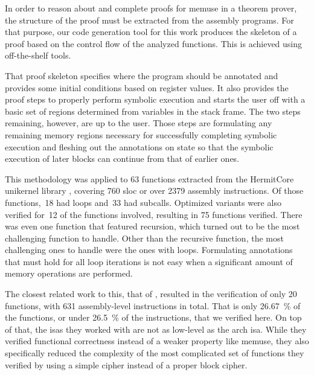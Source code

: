 In order to reason about and complete proofs for \gls{memuse} in a theorem prover, the structure of the proof must be extracted from the assembly programs.
For that purpose, our code generation tool for this work produces the skeleton of a proof based on the control flow of the analyzed functions.
This is achieved using off-the-shelf tools.

That proof skeleton specifies where the program should be annotated and provides some initial conditions based on register values.
It also provides the proof steps to properly perform symbolic execution and starts the user off with a basic set of regions determined from variables in the stack frame.
The two steps remaining, however, are up to the user.
Those steps are formulating any remaining memory regions necessary for successfully completing symbolic execution and fleshing out the annotations on state so that the symbolic execution of later blocks can continue from that of earlier ones.

This methodology was applied to \num{63} functions extracted from the HermitCore \autocite{lankes2016hermitcore} unikernel library \autocite{madhavapeddy2014unikernels}, covering \num{760} \gls{sloc} or over \num{2379} assembly instructions.
Of those functions,~\num{18} had loops and~\num{33} had subcalls.
Optimized variants were also verified for~\num{12} of the functions involved, resulting in \num{75} functions verified.
There was even one function that featured recursion, which turned out to be the most challenging function to handle.
Other than the recursive function, the most challenging ones to handle were the ones with loops.
Formulating annotations that must hold for all loop iterations is not easy when a significant amount of memory operations are performed.

The closest related work to this, that of \textcite{matthews2006verification}, resulted in the verification of only \num{20} functions, with \num{631} assembly-level instructions in total.
That is only \SI{26.67}{\percent} of the functions, or under \SI{26.5}{\percent} of the instructions, that we verified here.
On top of that, the \glspl{isa} they worked with are not as low-level as the \gls{arch} \gls{isa}.
While they verified functional correctness instead of a weaker property like \gls{memuse}, they also specifically reduced the complexity of the most complicated set of functions they verified by using a simple  cipher instead of a proper block cipher.

